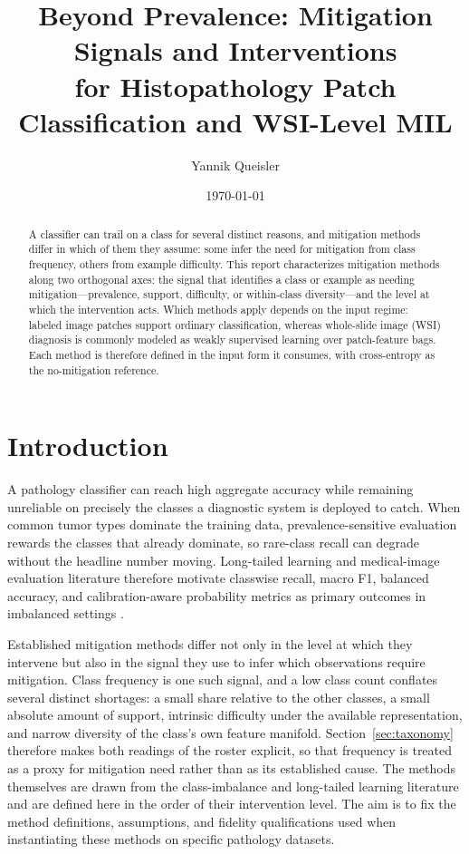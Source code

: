 \documentclass[11pt]{article}
\title{Beyond Prevalence: Mitigation Signals and Interventions\\
for Histopathology Patch Classification and WSI-Level MIL}
\author{Yannik Queisler}
\date{\today}
\begin{document}
\maketitle

\begin{abstract}
\noindent A classifier can trail on a class for several distinct reasons, and mitigation methods differ in which of them they assume: some infer the need for mitigation from class frequency, others from example difficulty. This report characterizes mitigation methods along two orthogonal axes: the signal that identifies a class or example as needing mitigation---prevalence, support, difficulty, or within-class diversity---and the level at which the intervention acts. Which methods apply depends on the input regime: labeled image patches support ordinary classification, whereas whole-slide image (WSI) diagnosis is commonly modeled as weakly supervised learning over patch-feature bags. Each method is therefore defined in the input form it consumes, with cross-entropy as the no-mitigation reference.
\end{abstract}

\setcounter{tocdepth}{2}
\tableofcontents
\clearpage

\section{Introduction}
A pathology classifier can reach high aggregate accuracy while remaining unreliable on precisely the classes a diagnostic system is deployed to catch. When common tumor types dominate the training data, prevalence-sensitive evaluation rewards the classes that already dominate, so rare-class recall can degrade without the headline number moving. Long-tailed learning and medical-image evaluation literature therefore motivate classwise recall, macro F1, balanced accuracy, and calibration-aware probability metrics as primary outcomes in imbalanced settings \citep{saini2023tacklingClass,zhang2023deepLong,mosquera2024classImbalance}.

Established mitigation methods differ not only in the level at which they intervene but also in the signal they use to infer which observations require mitigation. Class frequency is one such signal, and a low class count conflates several distinct shortages: a small share relative to the other classes, a small absolute amount of support, intrinsic difficulty under the available representation, and narrow diversity of the class's own feature manifold. Section~\ref{sec:taxonomy} therefore makes both readings of the roster explicit, so that frequency is treated as a proxy for mitigation need rather than as its established cause. The methods themselves are drawn from the class-imbalance and long-tailed learning literature and are defined here in the order of their intervention level. The aim is to fix the method definitions, assumptions, and fidelity qualifications used when instantiating these methods on specific pathology datasets.
\end{document}

